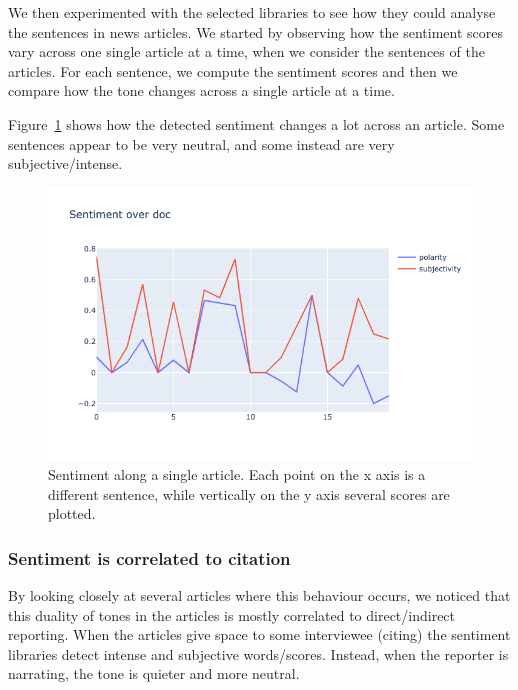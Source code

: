 We then experimented with the selected libraries to see how they could analyse the sentences in news articles. We started by observing how the sentiment scores vary across one single article at a time, when we consider the sentences of the articles. For each sentence, we compute the sentiment scores and then we compare how the tone changes across a single article at a time.

Figure~\ref{fig:sentiment_across_one_article} shows how the detected sentiment changes a lot across an article.
Some sentences appear to be very neutral, and some instead are very subjective/intense.

\begin{figure}[!htbp]
    \centering
    \includegraphics[width=\linewidth]{figures/sentiment_across_article.png}
    \caption{Sentiment along a single article. Each point on the x axis is a different sentence, while vertically on the y axis several scores are plotted.}
    \label{fig:sentiment_across_one_article}
\end{figure}

\subsubsection{Sentiment is correlated to citation}
By looking closely at several articles where this behaviour occurs, we noticed that this duality of tones in the articles is mostly correlated to direct/indirect reporting. When the articles give space to some interviewee (citing) the sentiment libraries detect intense and subjective words/scores. Instead, when the reporter is narrating, the tone is quieter and more neutral.

